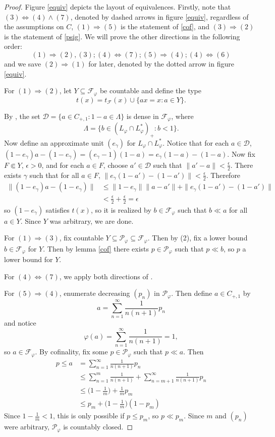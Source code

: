 \documentclass[10pt]{amsart}
\theoremstyle{definition}
\newcommand{\tF}{t_\mathscr{F}(x)}
\newcommand{\Fp}{\mathscr{F}_\varphi}
\newcommand{\Pp}{\mathscr{P}_\varphi}
\begin{document}
\begin{proof}
    Figure \ref{equiv} depicts the layout of equivalences. Firstly, note that $(3)\Leftrightarrow (4)\wedge(7)$, denoted by dashed arrows in figure \ref{equiv}, regardless of the assumptions on $C$, $(1)\Rightarrow (5)$ is the statement of \ref{cof}, and $(3)\Rightarrow (2)$ is the statement of \ref{psig}. We will prove the other directions in the following order: 
    \[(1) \Rightarrow (2),(3); (4)\Leftrightarrow (7);(5)\Rightarrow(4); (4)\Leftrightarrow(6)\]
    and we save $(2)\Rightarrow (1)$ for later, denoted by the dotted arrow in figure \ref{equiv}.
    
    For $(1)\Rightarrow (2)$, let $Y\subseteq\Fp$ be countable and define the type
    \[t(x)=\tF\cup\{ax=x:a\in Y\}.\]

    By \cite[5.3.4]{FA19}, the set $\mathscr{D}=\{a\in C_{+,1}:1-a\in \Lambda\}$ is dense in $\Fp$, where 
    \[\Lambda=\{b\in(L_\varphi\cap L_\varphi^*)_+:b<1\}.\]
    Now define an approximate unit $(e_\gamma)$ for $L_\varphi\cap L_\varphi^*$. Notice that for each $a\in \mathscr{D}$, $(1-e_\gamma)a-(1-e_\gamma) = (e_\gamma-1)(1-a)
        =e_\gamma(1-a)-(1-a).$ Now fix $F\Subset Y$, $\epsilon>0$, and for each $a\in F$, choose $a'\in\mathscr{D}$ such that $\|a'-a\|<\frac{\epsilon}{2}$. There exists $\gamma$ such that for all $a\in F$, $\|e_\gamma (1-a')-(1-a')\|<\frac{\epsilon}{2}$. Therefore
    \begin{align*}
        \|(1-e_\gamma)a-(1-e_\gamma)\| &\leq \|1-e_\gamma\|\|a-a'\|+\|e_\gamma(1-a')-(1-a')\| \\
        &<\frac{\epsilon}{2}+\frac{\epsilon}{2}=\epsilon
    \end{align*}
    so $(1-e_\gamma)$ satisfies $t(x)$, so it is realized by $b\in\Fp$ such that $b\ll a$ for all $a\in Y$. Since $Y$ was arbitrary, we are done.

    For $(1) \Rightarrow (3)$, fix countable $Y\subseteq\Pp\subseteq\Fp$. Then by (2), fix a lower bound $b\in\Fp$ for $Y$. Then by lemma \ref{cof} there exists $p\in\Pp$ such that $p\ll b$, so $p$ a lower bound for $Y$.

    For $(4) \Leftrightarrow (7)$, we apply both directions of \cite[4.1]{BI13}.

    For $(5)\Rightarrow (4)$, enumerate decreasing $(p_n)$ in $\Pp$. Then define $a\in C_{+,1}$ by
    \[a=\sum_{n=1}^\infty\frac{1}{n(n+1)}p_n\]
    and notice
    \[\varphi(a)=\sum_{n=1}^\infty\frac{1}{n(n+1)}=1,\]
    so $a\in\Fp$.
    By cofinality, fix some $p\in\Pp$ such that $p\ll a$. Then
    \begin{align*}
        p\leq a &= \sum_{n=1}^\infty\frac{1}{n(n+1)}p_n \\
        &\leq \sum_{n=1}^m\frac{1}{n(n+1)}+\sum_{n=m+1}^\infty\frac{1}{n(n+1)}p_n \\
        &\leq \bigg(1-\frac{1}{m}\bigg) +\frac{1}{m}p_m \\
        &\leq p_m+\bigg(1-\frac{1}{m}\bigg)(1-p_m)
    \end{align*}
    Since $1-\frac{1}{m}<1$, this is only possible if $p\leq p_m$, so $p\ll p_m$. Since $m$ and $(p_n)$ were arbitrary, $\Pp$ is countably closed.


\end{proof}
\end{document}
